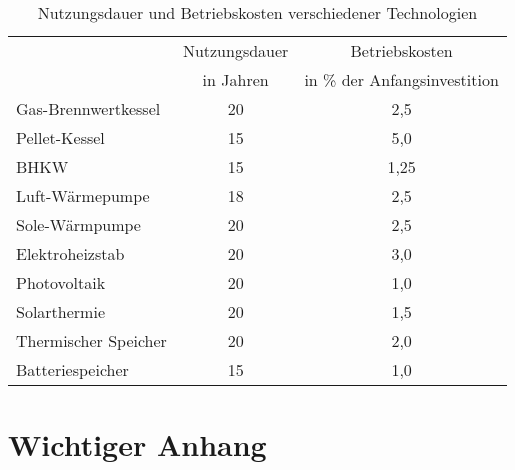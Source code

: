 \begin{table}[H]\centering
\begin{tabular}{|l|c|c|}
\hline
\rowcolor[HTML]{C0C0C0} 
\cellcolor[HTML]{C0C0C0} & Nutzungsdauer & Betriebskosten \\ \cline{2-3} 
\rowcolor[HTML]{C0C0C0} 
\multirow{-2}{*}{\cellcolor[HTML]{C0C0C0}Technologie} & in Jahren & in \% der Anfangsinvestition \\ \hline
Gas-Brennwertkessel & 20 & 2,5 \\ \hline
\rowcolor[HTML]{EFEFEF} 
Pellet-Kessel & 15 & 5,0 \\ \hline
BHKW & 15 & 1,25 \\ \hline
\rowcolor[HTML]{EFEFEF} 
Luft-Wärmepumpe & 18 & 2,5 \\ \hline
Sole-Wärmpumpe & 20 & 2,5 \\ \hline
\rowcolor[HTML]{EFEFEF} 
Elektroheizstab & 20 & 3,0 \\ \hline
Photovoltaik & 20 & 1,0 \\ \hline
\rowcolor[HTML]{EFEFEF} 
Solarthermie & 20 & 1,5 \\ \hline
Thermischer Speicher & 20 & 2,0 \\ \hline
\rowcolor[HTML]{EFEFEF} 
Batteriespeicher & 15 & 1,0 \\ \hline
\end{tabular}
\caption{Nutzungsdauer und Betriebskosten verschiedener Technologien}
\label{tab: TabelleA5}
\end{table}

\chapter{Wichtiger Anhang}
